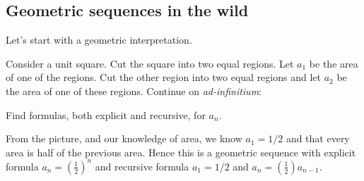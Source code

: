 \documentclass{ximera}
\begin{document}
\subsection{Geometric sequences in the wild}

Let's start with a geometric interpretation.

\begin{example}
  Consider a unit square. Cut the square into two equal regions. Let
  $a_1$ be the area of one of the regions. Cut the other region into
  two equal regions and let $a_2$ be the area of one of these
  regions. Continue on \textit{ad-infinitium}:
  \begin{image}
  \end{image}
  Find formulas, both explicit and recursive, for $a_n$.
  \begin{explanation}
    From the picture, and our knowledge of area, we know $a_1 = 1/2$
    and that every area is half of the previous area. Hence this is a
    geometric sequence with explicit formula $a_n = \left(\frac{1}{2}\right)^{n}$
    and recursive formula $a_1 = 1/2$ and $a_n =
    \left(\frac{1}{2}\right)a_{n-1}$.
  \end{explanation}
\end{example}
\end{document}
